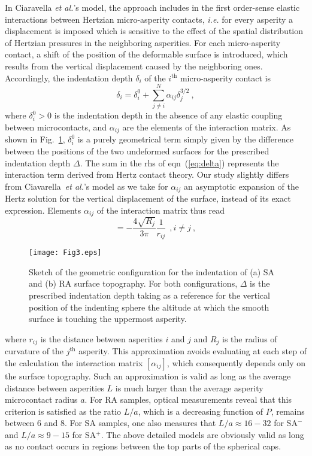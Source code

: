 \documentclass[pre,groupedaddress,showkeys,showpacs,twocolumn]{revtex4}
\begin{document}
%
\indent In Ciaravella \textit{et al.}'s model, the approach includes in the first order-sense elastic interactions between Hertzian micro-asperity contacts, \textit{i.e.} for every asperity a displacement is imposed which is sensitive to the effect of the spatial distribution of Hertzian pressures in the neighboring asperities. For each micro-asperity contact, a shift of the position of the deformable surface is introduced, which results from the vertical displacement caused by the neighboring ones. Accordingly, the indentation depth $\delta_i$ of the $i^\text{th}$ micro-asperity contact is
%
\begin{equation}
	\delta_i = \delta_i^0 + \sum_{j\neq i}^N\alpha_{ij}\delta_j^{3/2}\:,
	\label{eq:delta}
\end{equation}
%
where $\delta_i^0>0$ is the indentation depth in the absence of any elastic coupling between microcontacts, and $\alpha_{ij}$ are the elements of the interaction matrix. As shown in Fig.~\ref{fig:contact_sketch}, $\delta_i^0$ is a purely geometrical term simply given by the difference between the positions of the two undeformed surfaces for the prescribed indentation depth $\Delta$. The sum in the rhs of eqn~(\ref{eq:delta}) represents the interaction term derived from Hertz contact theory. Our study slightly differs from Ciavarella~\textit{et al.}'s model as we take for $\alpha_{ij}$ an asymptotic expansion of the Hertz solution for the vertical displacement of the surface, instead of its exact expression. Elements $\alpha_{ij}$ of the interaction matrix thus read
%
\begin{equation}
	[\alpha_{ij}] = - \frac{4 \sqrt{R_j}}{3 \pi} \frac{1}{r_{ij}} \:\:, i \neq  j\:,
	\label{eq:matA}
\end{equation}
%
\begin{figure}
	\texttt{[image: Fig3.eps]}
	\caption{Sketch of the geometric configuration for the indentation of (a) SA and (b) RA surface topography. For both configurations, $\Delta$ is the prescribed indentation depth taking as a reference for the vertical position of the indenting sphere the altitude at which the smooth surface is touching the uppermost asperity.}
	\label{fig:contact_sketch} 
\end{figure}
%
where $r_{ij}$ is the distance between asperities $i$ and $j$ and $R_j$ is the radius of curvature of the $j^\text{th}$ asperity. This approximation avoids evaluating at each step of the calculation the interaction matrix $[\alpha_{ij}]$, which consequently depends only on the surface topography. Such an approximation is valid as long as the average distance between asperities $L$ is much larger than the average asperity microcontact radius $a$. For RA samples, optical measurements reveal that this criterion is satisfied as the ratio $L/a$, which is a decreasing function of $P$, remains between 6 and 8. For SA samples, one also measures that $L/a \approx 16-32$ for SA$^-$ and $L/a \approx 9-15$ for SA$^+$. The above detailed models are obviously valid as long as no contact occurs in regions between the top parts of the spherical caps.\\
%
%
\end{document}
